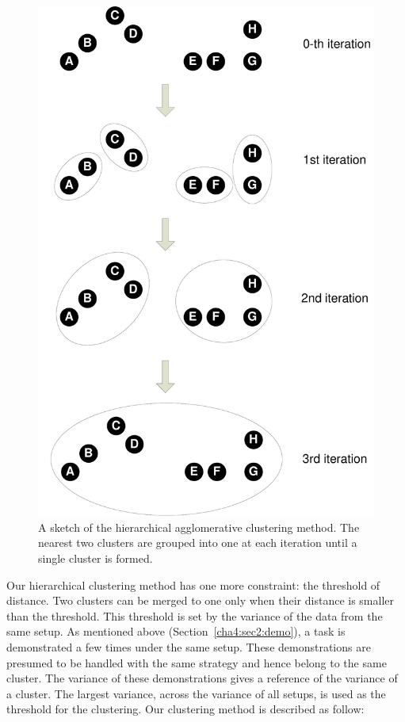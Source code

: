 \begin{figure}
  \centering
   \includegraphics[width=12cm]{./fig_cha4/hierarchicalclustering.pdf}
  \caption{ \scriptsize{A sketch of the hierarchical agglomerative clustering method. The nearest two clusters are grouped into one at each iteration until a single cluster is formed.}
}
\label{fig:hcluster}
\end{figure}

Our hierarchical clustering method has one more constraint: the threshold of distance. Two clusters can be merged to one only when their distance is smaller than the threshold. This threshold is set by the variance of the data from the same setup. As mentioned above (Section~\ref{cha4:sec2:demo}), a task is demonstrated a few times under the same setup. These demonstrations are presumed to be handled with the same strategy and hence belong to the same cluster. The variance of these demonstrations gives a reference of the variance of a cluster. The largest variance, across the variance of all setups, is used as the threshold for the clustering. Our clustering method is described as follow:

